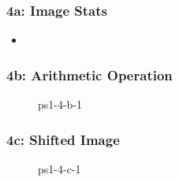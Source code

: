 \documentclass[../report.tex]{subfiles}
\begin{document}
    
    \begin{frame}[t]
        \frametitle{4a: Image Stats}
        \begin{normalsize}
            \begin{itemize}
                \setlength\itemsep{1em}
                
                \item[]{\fontsize{12pt}{12pt}\selectfont\textcolor{blue}{}}
                
            \end{itemize}
        \end{normalsize}
    \end{frame}

    \begin{frame}
        \frametitle{4b: Arithmetic Operation}
        \begin{figure}[!htb]
            \centering
            \caption{ps1-4-b-1}
        \end{figure}
    \end{frame}

    \begin{frame}
        \frametitle{4c: Shifted Image}
        \begin{figure}[!htb]
            \centering
            \caption{ps1-4-c-1}
        \end{figure}
    \end{frame}
\end{document}
